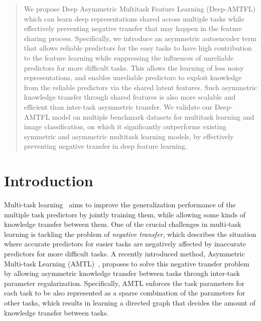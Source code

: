 \documentclass{article}
\begin{document}
	\begin{abstract}
		We propose Deep Asymmetric Multitask Feature Learning (Deep-AMTFL) which can learn deep representations shared across multiple tasks while effectively preventing negative transfer that may happen in the feature sharing process. Specifically, we introduce an asymmetric autoencoder term that allows reliable predictors for the easy tasks to have high contribution to the feature learning while suppressing the influences of unreliable predictors for more difficult tasks. This allows the learning of less noisy representations, and enables unreliable predictors to exploit knowledge from the reliable predictors via the shared latent features. Such asymmetric knowledge transfer through shared features is also more scalable and efficient than inter-task asymmetric transfer. We validate our Deep-AMTFL model on multiple benchmark datasets for multitask learning and image classification, on which it significantly outperforms existing symmetric and asymmetric multitask learning models, by effectively preventing negative transfer in deep feature learning.
	\end{abstract}
	
	\section{Introduction}
	
	Multi-task learning~\cite{caruana97} aims to improve the generalization performance of the multiple task predictors by jointly training them, while allowing some kinds of knowledge transfer between them. One of the crucial challenges in multi-task learning is tackling the problem of \emph{negative transfer}, which describes the situation where accurate predictors for easier tasks are negatively affected by inaccurate predictors for more difficult tasks. A recently introduced method, Asymmetric Multi-task Learning (AMTL)~\cite{amtl}, proposes to solve this negative transfer problem by allowing asymmetric knowledge transfer between tasks through inter-task parameter regularization. Specifically, AMTL enforces the task parameters for each task to be also represented as a sparse combination of the parameters for other tasks, which results in learning a directed graph that decides the amount of knowledge transfer between tasks.
	
\end{document}

